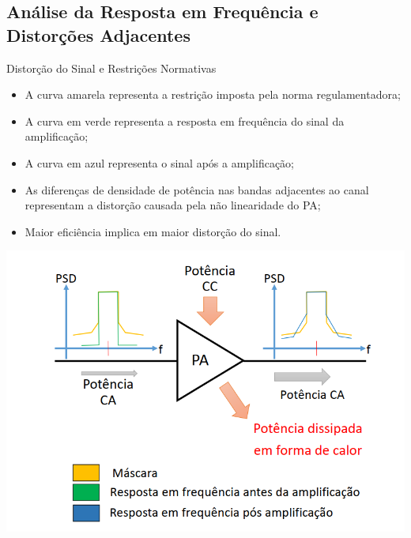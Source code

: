 \documentclass{if-beamer}
\begin{document}
\subsection{Análise da Resposta em Frequência e Distorções Adjacentes}
\begin{frame}{Distorção do Sinal e Restrições Normativas}

\begin{minipage}{.49\textwidth}

\begin{itemize}
    \item A curva amarela representa a restrição imposta pela norma regulamentadora;
    \item A curva em verde representa a resposta em frequência do sinal da amplificação;
    \item A curva em azul representa o sinal após a amplificação;
    \item As diferenças de densidade de potência nas bandas adjacentes ao canal representam a distorção causada pela não linearidade do PA;
    \item Maior eficiência implica em maior distorção do sinal.
\end{itemize}


\end{minipage}
\begin{minipage}{.49\textwidth}
	\includegraphics[scale=0.25]{normareg.png}
\end{minipage}

\end{frame}
\end{document}
